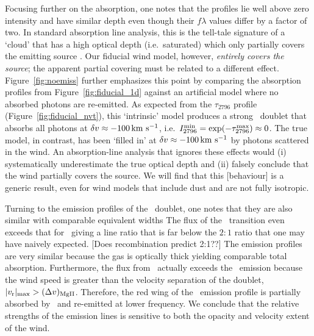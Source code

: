 \documentclass[12pt,preprint]{aastex}
\begin{document}
Focusing further on the  absorption, one notes that the profiles lie
well above zero intensity and have similar depth even though their $f\lambda$
values differ by a factor of two.  In standard absorption line
analysis, this is 
the tell-tale signature of a `cloud' that has a high optical depth (i.e.\
saturated) which only partially covers the emitting source
\citep[e.g.][]{hamann+10}.  Our fiducial wind model, however, 
{\it entirely covers the source}; the apparent partial covering must
be related to a different effect.
Figure~\ref{fig:noemiss} further emphasizes this point by comparing the 
absorption profiles from Figure~\ref{fig:fiducial_1d} against an
artificial model where no absorbed photons are 
re-emitted.   As expected from the
$\tau_{2796}$ profile (Figure~\ref{fig:fiducial_nvt}), this
`intrinsic' model
produces a strong \mgiid\ doublet that absorbs all photons at
$\delta v \approx -100 \, {\rm km~s^{-1}}$, i.e.\ $I_{2796}^{\rm min} = \exp(-\tau^{\rm
  max}_{2796}) \approx 0$.
The true model, in contrast, has been `filled in' at $\delta v \approx -100
\, {\rm km~s^{-1}}$ by photons scattered in the wind.  An
absorption-line analysis that ignores these effects
would (i) systematically underestimate the true optical
depth and (ii) falsely conclude that the wind partially covers the
source.  We will find that this
[behaviour] is a generic result, even for wind models that include
dust and are not fully isotropic.

Turning to the emission profiles of the \mgiid\ doublet, one notes
that they are also similar with comparable equivalent widths The
flux of the \mgiib\ transition even exceeds that for \mgiia\ giving a
line ratio that is far below the $2:1$ ratio that one may have naively
expected. 
[Does recombination predict 2:1??]
The emission profiles are very similar because the gas is optically
thick yielding comparable total absorption. 
Furthermore, the flux from \mgiib\ actually exceeds the
\mgiia\ emission because the wind speed is greater than the velocity separation
of the doublet, $|v_{\rm r}|_{\rm max} > (\Delta v)_{\rm MgII}$.
Therefore, the red wing of the
\mgiia\ emission profile is partially absorbed by \mgiib\ and
re-emitted at lower frequency.  We conclude that the relative
strengths of the emission lines is sensitive to both the opacity and
velocity extent of the wind.   
\end{document}
